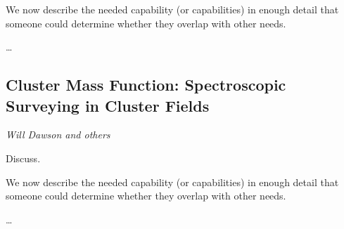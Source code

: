 We now describe the needed capability (or capabilities) in enough detail
that someone could determine whether they overlap with other needs.

\ldots


\subsection{Cluster Mass Function: Spectroscopic Surveying in Cluster Fields}
\label{sec:sl:clusters}
{\it Will Dawson and others}

Discuss.

We now describe the needed capability (or capabilities) in enough detail
that someone could determine whether they overlap with other needs.

\ldots

